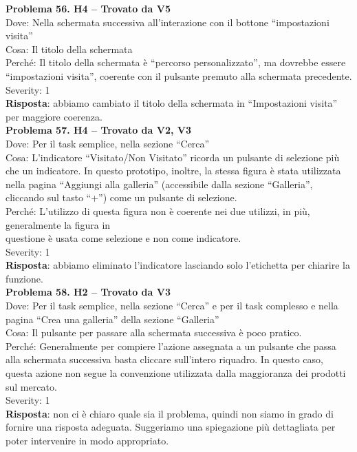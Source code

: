 \documentclass{article}
\begin{document}
\noindent \textbf{Problema 56. H4 – Trovato da V5} \\
Dove: Nella schermata successiva all’interazione con il bottone “impostazioni visita” \\
Cosa: Il titolo della schermata \\
Perché: Il titolo della schermata è “percorso personalizzato”, ma dovrebbe essere “impostazioni visita”, coerente con il pulsante premuto alla schermata precedente. \\
Severity: 1 \\
\textbf{Risposta}: abbiamo cambiato il titolo della schermata in “Impostazioni visita” per maggiore coerenza.\\

\noindent \textbf{Problema 57. H4 – Trovato da V2, V3} \\
Dove: Per il task semplice, nella sezione “Cerca” \\
Cosa: L’indicatore “Visitato/Non Visitato” ricorda un pulsante di selezione più che un indicatore. In questo prototipo, inoltre, la stessa figura è stata utilizzata nella pagina “Aggiungi alla galleria” (accessibile dalla sezione “Galleria”, cliccando sul tasto “+”) come un pulsante di selezione. \\
Perché: L’utilizzo di questa figura non è coerente nei due utilizzi, in più, generalmente la figura in \\ questione è usata come selezione e non come indicatore. \\
Severity: 1 \\
\textbf{Risposta}: abbiamo eliminato l’indicatore lasciando solo l’etichetta per chiarire la funzione.\\

\noindent \textbf{Problema 58. H2 – Trovato da V3} \\
Dove: Per il task semplice, nella sezione “Cerca” e per il task complesso e nella pagina “Crea una galleria” della sezione “Galleria” \\
Cosa: Il pulsante per passare alla schermata successiva è poco pratico. \\
Perché: Generalmente per compiere l’azione assegnata a un pulsante che passa alla schermata successiva basta cliccare sull’intero riquadro. In questo caso, questa azione non segue la convenzione utilizzata dalla maggioranza dei prodotti sul mercato. \\
Severity: 1 \\
\textbf{Risposta}: non ci è chiaro quale sia il problema, quindi non siamo in grado di fornire una risposta adeguata. Suggeriamo una spiegazione più dettagliata per poter intervenire in modo appropriato.\\
\end{document}
